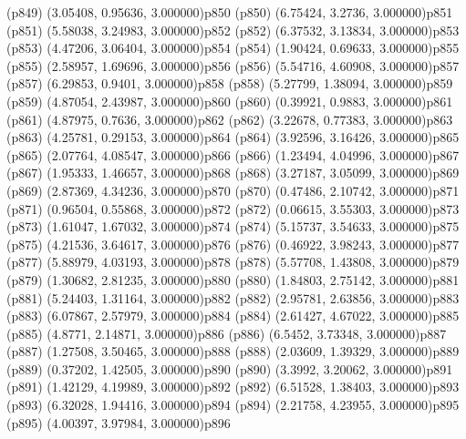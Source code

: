 \psdot(p849)
\psPoint(3.05408, 0.95636, 3.000000){p850}
\psdot(p850)
\psPoint(6.75424, 3.2736, 3.000000){p851}
\psdot(p851)
\psPoint(5.58038, 3.24983, 3.000000){p852}
\psdot(p852)
\psPoint(6.37532, 3.13834, 3.000000){p853}
\psdot(p853)
\psPoint(4.47206, 3.06404, 3.000000){p854}
\psdot(p854)
\psPoint(1.90424, 0.69633, 3.000000){p855}
\psdot(p855)
\psPoint(2.58957, 1.69696, 3.000000){p856}
\psdot(p856)
\psPoint(5.54716, 4.60908, 3.000000){p857}
\psdot(p857)
\psPoint(6.29853, 0.9401, 3.000000){p858}
\psdot(p858)
\psPoint(5.27799, 1.38094, 3.000000){p859}
\psdot(p859)
\psPoint(4.87054, 2.43987, 3.000000){p860}
\psdot(p860)
\psPoint(0.39921, 0.9883, 3.000000){p861}
\psdot(p861)
\psPoint(4.87975, 0.7636, 3.000000){p862}
\psdot(p862)
\psPoint(3.22678, 0.77383, 3.000000){p863}
\psdot(p863)
\psPoint(4.25781, 0.29153, 3.000000){p864}
\psdot(p864)
\psPoint(3.92596, 3.16426, 3.000000){p865}
\psdot(p865)
\psPoint(2.07764, 4.08547, 3.000000){p866}
\psdot(p866)
\psPoint(1.23494, 4.04996, 3.000000){p867}
\psdot(p867)
\psPoint(1.95333, 1.46657, 3.000000){p868}
\psdot(p868)
\psPoint(3.27187, 3.05099, 3.000000){p869}
\psdot(p869)
\psPoint(2.87369, 4.34236, 3.000000){p870}
\psdot(p870)
\psPoint(0.47486, 2.10742, 3.000000){p871}
\psdot(p871)
\psPoint(0.96504, 0.55868, 3.000000){p872}
\psdot(p872)
\psPoint(0.06615, 3.55303, 3.000000){p873}
\psdot(p873)
\psPoint(1.61047, 1.67032, 3.000000){p874}
\psdot(p874)
\psPoint(5.15737, 3.54633, 3.000000){p875}
\psdot(p875)
\psPoint(4.21536, 3.64617, 3.000000){p876}
\psdot(p876)
\psPoint(0.46922, 3.98243, 3.000000){p877}
\psdot(p877)
\psPoint(5.88979, 4.03193, 3.000000){p878}
\psdot(p878)
\psPoint(5.57708, 1.43808, 3.000000){p879}
\psdot(p879)
\psPoint(1.30682, 2.81235, 3.000000){p880}
\psdot(p880)
\psPoint(1.84803, 2.75142, 3.000000){p881}
\psdot(p881)
\psPoint(5.24403, 1.31164, 3.000000){p882}
\psdot(p882)
\psPoint(2.95781, 2.63856, 3.000000){p883}
\psdot(p883)
\psPoint(6.07867, 2.57979, 3.000000){p884}
\psdot(p884)
\psPoint(2.61427, 4.67022, 3.000000){p885}
\psdot(p885)
\psPoint(4.8771, 2.14871, 3.000000){p886}
\psdot(p886)
\psPoint(6.5452, 3.73348, 3.000000){p887}
\psdot(p887)
\psPoint(1.27508, 3.50465, 3.000000){p888}
\psdot(p888)
\psPoint(2.03609, 1.39329, 3.000000){p889}
\psdot(p889)
\psPoint(0.37202, 1.42505, 3.000000){p890}
\psdot(p890)
\psPoint(3.3992, 3.20062, 3.000000){p891}
\psdot(p891)
\psPoint(1.42129, 4.19989, 3.000000){p892}
\psdot(p892)
\psPoint(6.51528, 1.38403, 3.000000){p893}
\psdot(p893)
\psPoint(6.32028, 1.94416, 3.000000){p894}
\psdot(p894)
\psPoint(2.21758, 4.23955, 3.000000){p895}
\psdot(p895)
\psPoint(4.00397, 3.97984, 3.000000){p896}
